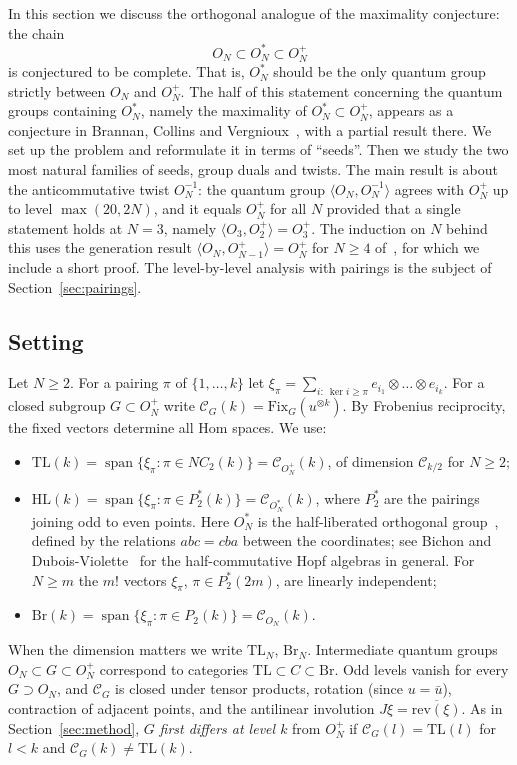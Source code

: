 \documentclass[11pt]{amsart}
\theoremstyle{definition}
\theoremstyle{remark}
\theoremstyle{plain}
\numberwithin{equation}{section}
\numberwithin{table}{section}
\newcommand{\TL}{\mathrm{TL}}
\newcommand{\HL}{\mathrm{HL}}
\newcommand{\Br}{\mathrm{Br}}
\newcommand{\Fix}{\mathrm{Fix}}
\DeclareMathOperator{\spn}{span}
\begin{document}
In this section we discuss the orthogonal analogue of the maximality conjecture: the chain
\[
O_N\subset O_N^*\subset O_N^+
\]
is conjectured to be complete. That is, $O_N^*$ should be the only quantum group strictly between $O_N$ and $O_N^+$. The
half of this statement concerning the quantum groups containing $O_N^*$, namely the maximality of $O_N^*\subset O_N^+$,
appears as a conjecture in Brannan, Collins and Vergnioux~\cite[Sec.~5]{bcv}, with a partial result there. We
set up the problem and reformulate it in terms of ``seeds''. Then we study the two most natural families of seeds, group
duals and twists. The main result is about the anticommutative twist $O_N^{-1}$: the quantum group $\langle O_N,O_N^{-1}\rangle$
agrees with $O_N^+$ up to level $\max(20,2N)$, and it equals $O_N^+$ for all $N$ provided that a single statement holds at
$N=3$, namely $\langle O_3,O_2^+\rangle=O_3^+$. The induction on $N$ behind this uses the generation result
$\langle O_N,O_{N-1}^+\rangle=O_N^+$ for $N\ge4$ of~\cite{bcv}, for which we include a short proof. The level-by-level
analysis with pairings is the subject of Section~\ref{sec:pairings}.

\subsection{Setting}

Let $N\ge 2$. For a pairing $\pi$ of $\{1,\dots,k\}$ let $\xi_\pi=\sum_{i:\ \ker i\ge\pi}e_{i_1}\otimes\dots\otimes e_{i_k}$.
For a closed subgroup $G\subset O_N^+$ write $\mathcal C_G(k)=\Fix_G(u^{\otimes k})$. By Frobenius reciprocity, the fixed
vectors determine all Hom spaces. We use:
\begin{itemize}[leftmargin=2em]
\item $\TL(k)=\spn\{\xi_\pi:\pi\in NC_2(k)\}=\mathcal C_{O_N^+}(k)$, of dimension $\mathcal C_{k/2}$ for $N\ge2$;
\item $\HL(k)=\spn\{\xi_\pi:\pi\in P_2^*(k)\}=\mathcal C_{O_N^*}(k)$, where $P_2^*$ are the pairings joining odd to even points. Here $O_N^*$ is the half-liberated orthogonal group~\cite{bsp}, defined by the relations $abc=cba$ between the coordinates; see Bichon and Dubois-Violette~\cite{bdv} for the half-commutative Hopf algebras in general.
For $N\ge m$ the $m!$ vectors $\xi_\pi$, $\pi\in P_2^*(2m)$, are linearly independent;
\item $\Br(k)=\spn\{\xi_\pi:\pi\in P_2(k)\}=\mathcal C_{O_N}(k)$.
\end{itemize}
When the dimension matters we write $\TL_N$, $\Br_N$. Intermediate quantum groups $O_N\subset G\subset O_N^+$ correspond to
categories $\TL\subset C\subset\Br$. Odd levels vanish for every $G\supset O_N$, and $\mathcal C_G$ is closed under tensor products,
rotation (since $u=\bar u$), contraction of adjacent points, and the antilinear involution $J\xi=\overline{\mathrm{rev}(\xi)}$.
As in Section~\ref{sec:method}, $G$ \emph{first differs at level $k$} from $O_N^+$ if $\mathcal C_G(l)=\TL(l)$ for $l<k$ and $\mathcal C_G(k)\ne\TL(k)$.
\end{document}
